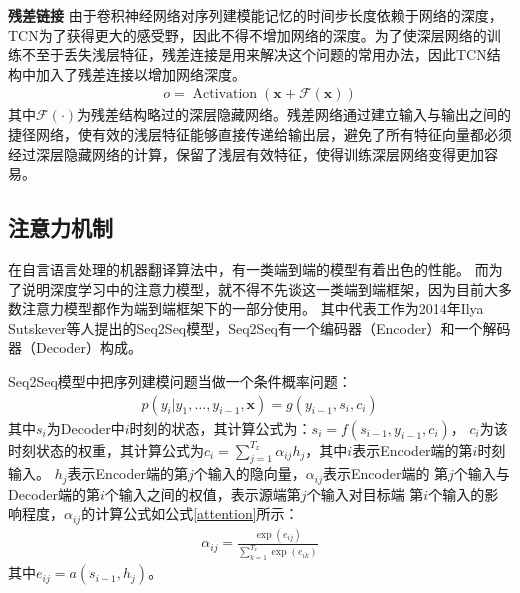 \textbf{残差链接}
由于卷积神经网络对序列建模能记忆的时间步长度依赖于网络的深度，TCN为了获得更大的感受野，因此不得不增加网络的深度。为了使深层网络的训练不至于丢失浅层特征，残差连接是用来解决这个问题的常用办法，因此TCN结构中加入了残差连接以增加网络深度。
\begin{align}
  o=\operatorname{Activation}(\mathbf{x}+\mathcal{F}(\mathbf{x}))
\end{align}
其中$\mathcal{F}(\cdot)$为残差结构略过的深层隐藏网络。残差网络通过建立输入与输出之间的捷径网络，使有效的浅层特征能够直接传递给输出层，避免了所有特征向量都必须经过深层隐藏网络的计算，保留了浅层有效特征，使得训练深层网络变得更加容易。



\subsection{注意力机制}
在自言语言处理的机器翻译算法中，有一类端到端的模型有着出色的性能。
而为了说明深度学习中的注意力模型，就不得不先谈这一类端到端框架，因为目前大多数注意力模型都作为端到端框架下的一部分使用。
其中代表工作为2014年Ilya Sutskever等人提出的Seq2Seq模型，Seq2Seq有一个编码器（Encoder）和一个解码器（Decoder）构成。

Seq2Seq模型中把序列建模问题当做一个条件概率问题：
\begin{align}
  p\left(y_{i} | y_{1}, \ldots, y_{i-1}, \mathbf{x}\right)=g\left(y_{i-1}, s_{i}, c_{i}\right)
\end{align}
其中$s_{i}$为Decoder中$i$时刻的状态，其计算公式为：$s_{i}=f\left(s_{i-1}, y_{i-1}, c_{i}\right)$，
$c_{i}$为该时刻状态的权重，其计算公式为$c_{i}=\sum_{j=1}^{T_{x}} \alpha_{ij} h_{j}$，其中$i$表示Encoder端的第$i$时刻输入。
$h_{j}$表示Encoder端的第$j$个输入的隐向量，$\alpha_{i j}$表示Encoder端的%
第$j$个输入与Decoder端的第$i$个输入之间的权值，表示源端第$j$个输入对目标端%
第$i$个输入的影响程度，$\alpha_{i j}$的计算公式如公式\eqref{attention}所示：
\begin{align}
  \alpha_{i j}=\frac{\exp \left(e_{i j}\right)}{\sum_{k=1}^{T_{x}} \exp \left(e_{i k}\right)} \label{attention}
\end{align} 
其中$e_{i j}=a\left(s_{i-1}, h_{j}\right)$。

